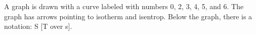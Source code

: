 A graph is drawn with a curve labeled with numbers 0, 2, 3, 4, 5, and 6. The graph has arrows pointing to isotherm and isentrop. Below the graph, there is a notation: S [T over s].